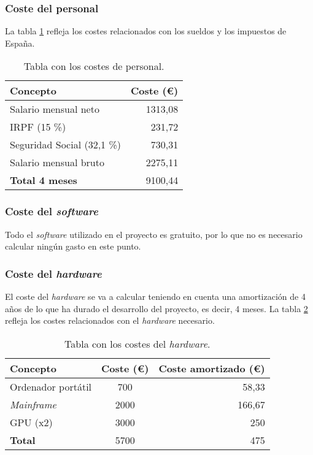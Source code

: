 \subsubsection{Coste del personal}
La tabla \ref{tab:coste_personal} refleja los costes relacionados con los sueldos y los impuestos de España.
\begin{table}[h]
	\begin{center}
		\begin{tabular}{ l r }
			\toprule
			\textbf{Concepto} & \textbf{Coste (€)} \\ \midrule
			Salario mensual neto \cite{salario} & 1313,08 \\
			IRPF (15 \%) & 231,72 \\ 
			Seguridad Social (32,1 \%) & 730,31 \\
			Salario mensual bruto & 2275,11 \\ \midrule
			\textbf{Total 4 meses} & 9100,44 \\ \bottomrule
		\end{tabular}
		\caption{Tabla con los costes de personal.}
		\label{tab:coste_personal}
	\end{center}
\end{table}

\subsubsection{Coste del \textit{software}}
Todo el \textit{software} utilizado en el proyecto es gratuito, por lo que no es necesario calcular ningún gasto en este punto.

\subsubsection{Coste del \textit{hardware}}
El coste del \textit{hardware} se va a calcular teniendo en cuenta una amortización de 4 años de lo que ha durado el desarrollo del proyecto, es decir, 4 meses. La tabla \ref{tab:coste_hardware} refleja los costes relacionados con el \textit{hardware} necesario.

\begin{table}[h]
	\begin{center}
		\begin{tabular}{ l c r }
			\toprule
			\textbf{Concepto} & \textbf{Coste (€)} & \textbf{Coste amortizado (€)} \\ \midrule
			Ordenador portátil & 700 & 58,33 \\
			\textit{Mainframe} & 2000 & 166,67 \\
			GPU (x2) & 3000 & 250 \\ \midrule
			\textbf{Total} & 5700 & 475 \\ \bottomrule
		\end{tabular}
		\caption{Tabla con los costes del \textit{hardware}.}
		\label{tab:coste_hardware}
	\end{center}
\end{table}

